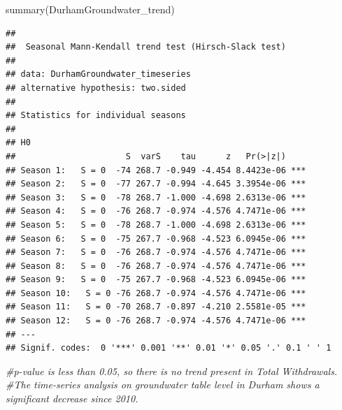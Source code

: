 \documentclass[
  12pt,
]{article}
\newenvironment{Shaded}{\begin{snugshade}}{\end{snugshade}}
\newcommand{\AttributeTok}[1]{\textcolor[rgb]{0.77,0.63,0.00}{#1}}
\newcommand{\CommentTok}[1]{\textcolor[rgb]{0.56,0.35,0.01}{\textit{#1}}}
\newcommand{\DecValTok}[1]{\textcolor[rgb]{0.00,0.00,0.81}{#1}}
\newcommand{\FunctionTok}[1]{\textcolor[rgb]{0.00,0.00,0.00}{#1}}
\newcommand{\NormalTok}[1]{#1}
\newcommand{\OtherTok}[1]{\textcolor[rgb]{0.56,0.35,0.01}{#1}}
\newcommand{\SpecialCharTok}[1]{\textcolor[rgb]{0.00,0.00,0.00}{#1}}
\newcommand{\StringTok}[1]{\textcolor[rgb]{0.31,0.60,0.02}{#1}}
\begin{document}
\begin{Shaded}
\begin{Highlighting}[]
\FunctionTok{summary}\NormalTok{(DurhamGroundwater\_trend)}
\end{Highlighting}
\end{Shaded}

\begin{verbatim}
## 
##  Seasonal Mann-Kendall trend test (Hirsch-Slack test)
## 
## data: DurhamGroundwater_timeseries
## alternative hypothesis: two.sided
## 
## Statistics for individual seasons
## 
## H0
##                      S  varS    tau      z   Pr(>|z|)    
## Season 1:   S = 0  -74 268.7 -0.949 -4.454 8.4423e-06 ***
## Season 2:   S = 0  -77 267.7 -0.994 -4.645 3.3954e-06 ***
## Season 3:   S = 0  -78 268.7 -1.000 -4.698 2.6313e-06 ***
## Season 4:   S = 0  -76 268.7 -0.974 -4.576 4.7471e-06 ***
## Season 5:   S = 0  -78 268.7 -1.000 -4.698 2.6313e-06 ***
## Season 6:   S = 0  -75 267.7 -0.968 -4.523 6.0945e-06 ***
## Season 7:   S = 0  -76 268.7 -0.974 -4.576 4.7471e-06 ***
## Season 8:   S = 0  -76 268.7 -0.974 -4.576 4.7471e-06 ***
## Season 9:   S = 0  -75 267.7 -0.968 -4.523 6.0945e-06 ***
## Season 10:   S = 0 -76 268.7 -0.974 -4.576 4.7471e-06 ***
## Season 11:   S = 0 -70 268.7 -0.897 -4.210 2.5581e-05 ***
## Season 12:   S = 0 -76 268.7 -0.974 -4.576 4.7471e-06 ***
## ---
## Signif. codes:  0 '***' 0.001 '**' 0.01 '*' 0.05 '.' 0.1 ' ' 1
\end{verbatim}

\begin{Shaded}
\begin{Highlighting}[]
\CommentTok{\#p{-}value is less than 0.05, so there is no trend present in Total Withdrawals.}
\CommentTok{\#The time{-}series analysis on groundwater table level in Durham shows a significant decrease since 2010. }
\end{Highlighting}
\end{Shaded}

\begin{Shaded}
\end{Shaded}
\end{document}
